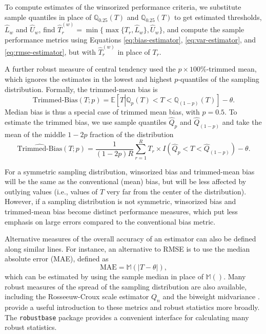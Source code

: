 \documentclass[
]{book}
\newcommand{\E}{\mathbb{E}}
\newcommand{\M}{\mathbb{M}}
\newcommand{\Q}{\mathbb{Q}}
\begin{document}
To compute estimates of the winsorized performance criteria, we substitute sample quantiles in place of \(\Q_{0.25}(T)\) and \(\Q_{0.25}(T)\) to get estimated thresholds, \(\hat{L}_w\) and \(\hat{U}_w\), find \(\hat{T}_r^{(w)} = \min\{\max\{T_r, \hat{L}_w\}, \hat{U}_w\}\), and compute the sample performance metrics using Equations \eqref{eq:bias-estimator}, \eqref{eq:var-estimator}, and \eqref{eq:rmse-estimator}, but with \(\hat{T}_r^{(w)}\) in place of \(T_r\).

A further robust measure of central tendency used the \(p \times 100\%\)-trimmed mean, which ignores the estimates in the lowest and highest \(p\)-quantiles of the sampling distribution.
Formally, the trimmed-mean bias is
\[
\text{Trimmed-Bias}(T; p) = \E\left[ T \left| \Q_{p}(T) < T < \Q_{(1 - p)}(T) \right.\right] - \theta. \label{eq:trimmed-bias}
\]
Median bias is thus a special case of trimmed mean bias, with \(p = 0.5\).
To estimate the trimmed bias, we use sample quantiles \(\hat{Q}_p\) and \(\hat{Q}_{(1 - p)}\) and take the mean of the middle \(1 - 2p\) fraction of the distribution
\[
\widehat{\text{Trimmed-Bias}}(T; p) = \frac{1}{(1 - 2p)R} \sum_{r=1}^R T_r \times I\left(\hat{Q}_{p} < T < \hat{Q}_{(1 - p)}\right) - \theta. \label{eq:sample-trimmed-bias}
\]

For a symmetric sampling distribution, winsorized bias and trimmed-mean bias will be the same as the conventional (mean) bias, but will be less affected by outlying values (i.e., values of \(T\) very far from the center of the distribution).
However, if a sampling distribution is not symmetric, winsorized bias and trimmed-mean bias become distinct performance measures, which put less emphasis on large errors compared to the conventional bias metric.

Alternative measures of the overall accuracy of an estimator can also be defined along similar lines.
For instance, an alternative to RMSE is to use the median absolute error (MAE), defined as
\[
\text{MAE} = \M\left(\left|T - \theta\right|\right),
\]
which can be estimated by using the sample median in place of \(\M()\).
Many robust measures of the spread of the sampling distribution are also available, including the Rosseeuw-Croux scale estimator \(Q_n\) \citep{Rousseeuw1993alternatives} and the biweight midvariance \citep{Wilcox2022introduction}.
\citet{Maronna2006robust} provide a useful introduction to these metrics and robust statistics more broadly.
The \texttt{robustbase} package \citep{robustbase} provides a convenient interface for calculating many robust statistics.
\end{document}
